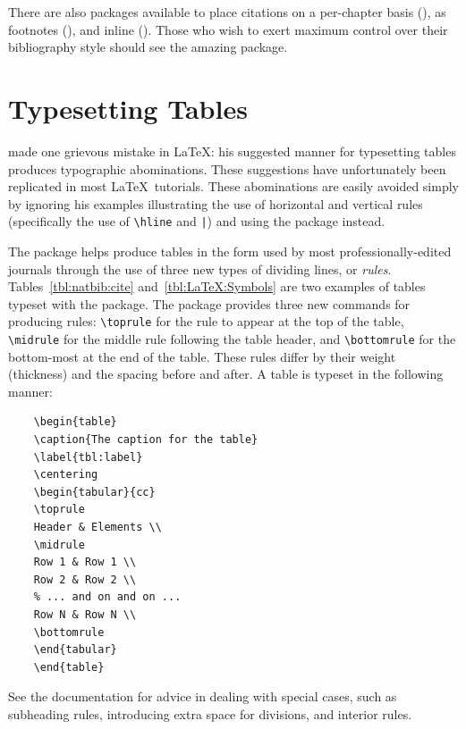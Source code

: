 There are also packages available to place citations on a per-chapter
basis (), as footnotes (),
and inline ().
Those who wish to exert maximum control over their bibliography
style should see the amazing  package.

\section{Typesetting Tables}
\label{sec:TypesettingTables}

\citet{lamport-1994-ladps} made one grievous mistake
in \LaTeX: his suggested manner for typesetting tables produces
typographic abominations.  These suggestions have unfortunately
been replicated in most \LaTeX\ tutorials.  These
abominations are easily avoided simply by ignoring his examples
illustrating the use of horizontal and vertical rules (specifically
the use of \verb+\hline+ and \verb+|+) and using the
 package instead.

The  package helps produce tables in the form
used by most professionally-edited journals through the use of
three new types of dividing lines, or \emph{rules}.
Tables~\ref{tbl:natbib:cite} and~\ref{tbl:LaTeX:Symbols} are two
examples of tables typeset with the  package.
The  package provides three new commands
for producing rules:
\verb+\toprule+ for the rule to appear at the top of the table,
\verb+\midrule+ for the middle rule following the table header,
and \verb+\bottomrule+ for the bottom-most at the end of the table.
These rules differ by their weight (thickness) and the spacing before
and after.
A table is typeset in the following manner:
\begin{lstlisting}
    \begin{table}
    \caption{The caption for the table}
    \label{tbl:label}
    \centering
    \begin{tabular}{cc}
    \toprule
    Header & Elements \\
    \midrule
    Row 1 & Row 1 \\
    Row 2 & Row 2 \\
    % ... and on and on ...
    Row N & Row N \\
    \bottomrule
    \end{tabular}
    \end{table}
\end{lstlisting}
See the  documentation for advice in dealing with
special cases, such as subheading rules, introducing extra space
for divisions, and interior rules.


